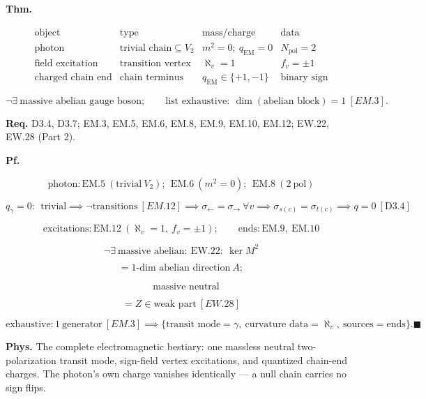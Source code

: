 \begin{theorem}\label{tag:EM-22}
\textbf{Thm.}

\[
\begin{array}{c|c|c|c}
\text{object} & \text{type} & \text{mass/charge} & \text{data}\\ \hline
\text{photon} & \text{trivial chain}\subseteq V_2 & m^2=0;\ q_{\mathrm{EM}}=0 & N_{\mathrm{pol}}=2\\
\text{field excitation} & \text{transition vertex} & \aleph_v=1 & f_v=\pm1\\
\text{charged chain end} & \text{chain terminus} & q_{\mathrm{EM}}\in\{+1,-1\} & \text{binary sign}
\end{array}
\]

\[
\neg\exists\ \text{massive abelian gauge boson};\qquad\text{list exhaustive}:\ \dim(\text{abelian block})=1\ [EM.3].
\]

\textbf{Req.} D3.4, D3.7; EM.3, EM.5, EM.6, EM.8, EM.9, EM.10, EM.12; EW.22, EW.28 (Part 2).

\textbf{Pf.}

\[
\text{photon}: \mathrm{EM.5}\ (\text{trivial}\ V_2);\ \ \mathrm{EM.6}\ (m^2=0);\ \ \mathrm{EM.8}\ (2\ \text{pol})
\]

\[
q_\gamma=0:\ \ \text{trivial}\implies\neg\text{transitions}\ [EM.12]\implies\sigma_{\leftarrow}=\sigma_{\rightarrow}\ \forall v\implies\sigma_{s(c)}=\sigma_{t(c)}\implies q=0\ [\mathrm{D3.4}]
\]

\[
\text{excitations}: \mathrm{EM.12}\ (\aleph_v=1,\ f_v=\pm1);\qquad\text{ends}: \mathrm{EM.9},\ \mathrm{EM.10}
\]

\[
\neg\exists\ \text{massive abelian}: \ \mathrm{EW.22}:\ \ker M^2
\]

\[
= \text{1-dim abelian direction}\ A;
\]

\[
\quad\text{massive neutral}
\]

\[
= Z\in\text{weak part}\ [EW.28]
\]

\[
\text{exhaustive}: 1\ \text{generator}\ [EM.3]\implies\{\text{transit mode}=\gamma,\ \text{curvature data}=\aleph_v,\ \text{sources}=\text{ends}\}. \blacksquare
\]

\textbf{Phys.} The complete electromagnetic bestiary: one massless neutral two-polarization transit mode, sign-field vertex excitations, and quantized chain-end charges. The photon’s own charge vanishes identically — a null chain carries no sign flips.

\end{theorem}

